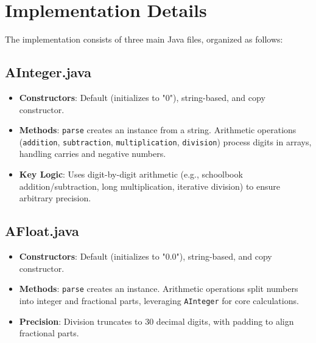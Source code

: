 \documentclass[12pt]{article}
\begin{document}

\section{Implementation Details}
The implementation consists of three main Java files, organized as follows:

\subsection{AInteger.java}
\begin{itemize}
    \item \textbf{Constructors}: Default (initializes to "0"), string-based, and copy constructor.
    \item \textbf{Methods}: \texttt{parse} creates an instance from a string. Arithmetic operations (\texttt{addition}, \texttt{subtraction}, \texttt{multiplication}, \texttt{division}) process digits in arrays, handling carries and negative numbers.
    \item \textbf{Key Logic}: Uses digit-by-digit arithmetic (e.g., schoolbook addition/subtraction, long multiplication, iterative division) to ensure arbitrary precision.
\end{itemize}

\subsection{AFloat.java}
\begin{itemize}
    \item \textbf{Constructors}: Default (initializes to "0.0"), string-based, and copy constructor.
    \item \textbf{Methods}: \texttt{parse} creates an instance. Arithmetic operations split numbers into integer and fractional parts, leveraging \texttt{AInteger} for core calculations.
    \item \textbf{Precision}: Division truncates to 30 decimal digits, with padding to align fractional parts.
\end{itemize}
\end{document}
